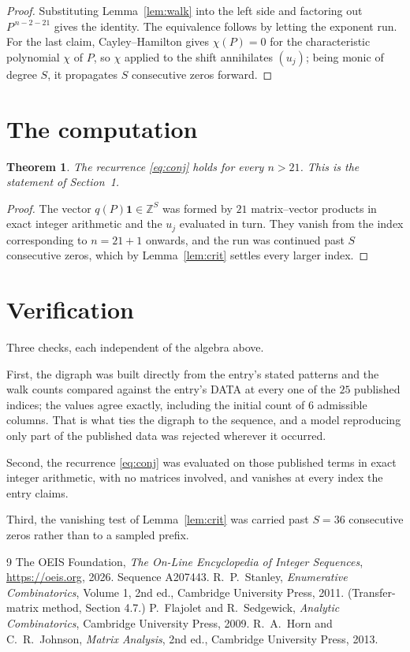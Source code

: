 \documentclass[11pt,a4paper]{article}
\theoremstyle{plain}
\newtheorem{theorem}{Theorem}
\theoremstyle{definition}
\begin{document}
\begin{proof}
Substituting Lemma~\ref{lem:walk} into the left side and factoring out
$P^{\,n-2-21}$ gives the identity. The equivalence follows by letting the exponent
run. For the last claim, Cayley--Hamilton gives $\chi(P)=0$ for the characteristic
polynomial $\chi$ of $P$, so $\chi$ applied to the shift annihilates $(u_j)$; being monic of
degree $S$, it propagates $S$ consecutive zeros forward.
\end{proof}

\section{The computation}

\begin{theorem}
The recurrence \eqref{eq:conj} holds for every $n>21$. This is the statement of
Section~1.
\end{theorem}

\begin{proof}
The vector $q(P)\mathbf{1}\in\mathbb{Z}^{S}$ was formed by $21$ matrix--vector
products in exact integer arithmetic and the $u_j$ evaluated in turn. They vanish from the
index corresponding to $n=21+1$ onwards, and the run was continued past $S$ consecutive
zeros, which by Lemma~\ref{lem:crit} settles every larger index.
\end{proof}

\section{Verification}

Three checks, each independent of the algebra above.

First, the digraph was built directly from the entry's stated patterns and the walk counts
compared against the entry's DATA at every one of the $25$ published indices; the
values agree exactly, including the initial count of $6$ admissible columns. That is
what ties the digraph to the sequence, and a model reproducing only part of the published
data was rejected wherever it occurred.

Second, the recurrence \eqref{eq:conj} was evaluated on those published terms in exact
integer arithmetic, with no matrices involved, and vanishes at every index the entry claims.

Third, the vanishing test of Lemma~\ref{lem:crit} was carried past $S=36$ consecutive
zeros rather than to a sampled prefix.

\begin{thebibliography}{9}
 The OEIS Foundation, \emph{The On-Line Encyclopedia of Integer
Sequences}, \url{https://oeis.org}, 2026. Sequence A207443.
 R.~P.~Stanley, \emph{Enumerative Combinatorics}, Volume 1, 2nd ed.,
Cambridge University Press, 2011. (Transfer-matrix method, Section 4.7.)
 P.~Flajolet and R.~Sedgewick, \emph{Analytic Combinatorics}, Cambridge
University Press, 2009.
 R.~A.~Horn and C.~R.~Johnson, \emph{Matrix Analysis}, 2nd ed., Cambridge
University Press, 2013.
\end{thebibliography}
\end{document}
